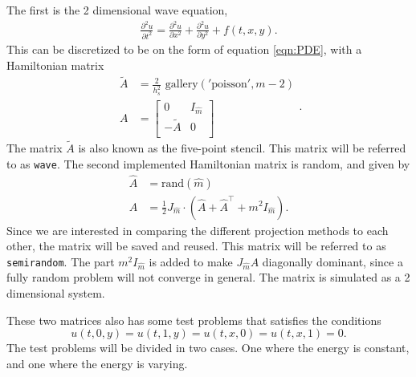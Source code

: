 The first is the 2 dimensional wave equation, 
\begin{equation}
\begin{aligned}
\frac{\partial^2 u}{\partial t^2} = \frac{\partial^2 u}{\partial x^2}+ \frac{\partial^2 u}{\partial y^2} + f(t,x,y).
\end{aligned}
\label{eqn:wave}
\end{equation}
This can be discretized to be on the form of equation \eqref{eqn:PDE}, with a Hamiltonian matrix
\begin{equation}
\begin{aligned}
\tilde{A} &= \frac{2}{h_s^2} \text{ gallery}('\text{poisson}', m-2) \\
A &= 
\begin{bmatrix}
 0 & I_{\hat{m}} \\ - \tilde{A} & 0 \\
\end{bmatrix}
\end{aligned}.
\end{equation}
The matrix $\tilde{A}$ is also known as the five-point stencil\cite{fivepoint}. This matrix will be referred to as \texttt{wave}. The second implemented Hamiltonian matrix is random, and given by
\begin{equation}
\begin{aligned}
\hat{A} &= \text{rand}(\hat{m}) \\
A &= \frac{1}{2} J_{\hat{m}} \cdot (\hat{A} + \hat{A}^\top + m^2 I_{\hat{m}}).
\end{aligned}
\end{equation}
Since we are interested in comparing the different projection methods to each other, the matrix will be saved and reused. This matrix will be referred to as \texttt{semirandom}. The part $m^2 I_{\hat{m}} $ is added to make $J_{\hat{m}}A$ diagonally dominant, since a fully random problem will not converge in general. The matrix is simulated as a 2 dimensional system. 

These two matrices also has some test problems that satisfies the conditions $$u(t,0,y) = u(t,1,y) = u(t,x,0) = u(t,x,1) = 0.$$ The test problems will be divided in two cases. One where the energy is constant, and one where the energy is varying. \\

